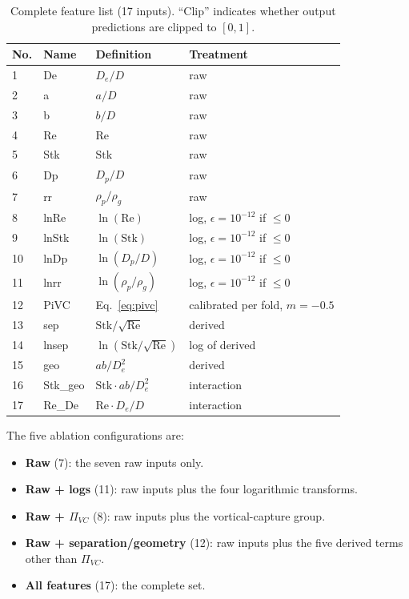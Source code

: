 \documentclass[12pt]{article}
\newcommand{\Stk}{\mathrm{Stk}}
\newcommand{\Rey}{\mathrm{Re}}
\newcommand{\PiVC}{\Pi_{VC}}
\begin{document}
\begin{table}[!ht]\centering
\caption{Complete feature list (17 inputs). ``Clip'' indicates whether output predictions are clipped to $[0,1]$.}
\label{tab:featurelist}\small
\begin{tabular}{llll}
\toprule
No. & Name & Definition & Treatment \\
\midrule
1 & De & $D_e/D$ & raw \\
2 & a & $a/D$ & raw \\
3 & b & $b/D$ & raw \\
4 & Re & $\Rey$ & raw \\
5 & Stk & $\Stk$ & raw \\
6 & Dp & $D_p/D$ & raw \\
7 & rr & $\rho_p/\rho_g$ & raw \\
\midrule
8 & lnRe & $\ln(\Rey)$ & log, $\epsilon=10^{-12}$ if $\leq0$ \\
9 & lnStk & $\ln(\Stk)$ & log, $\epsilon=10^{-12}$ if $\leq0$ \\
10 & lnDp & $\ln(D_p/D)$ & log, $\epsilon=10^{-12}$ if $\leq0$ \\
11 & lnrr & $\ln(\rho_p/\rho_g)$ & log, $\epsilon=10^{-12}$ if $\leq0$ \\
\midrule
12 & PiVC & Eq.~\eqref{eq:pivc} & calibrated per fold, $m=-0.5$ \\
13 & sep & $\Stk/\sqrt{\Rey}$ & derived \\
14 & lnsep & $\ln(\Stk/\sqrt{\Rey})$ & log of derived \\
15 & geo & $ab/D_e^2$ & derived \\
16 & Stk\_geo & $\Stk \cdot ab/D_e^2$ & interaction \\
17 & Re\_De & $\Rey \cdot D_e/D$ & interaction \\
\bottomrule
\end{tabular}
\end{table}

The five ablation configurations are:
\begin{itemize}[noitemsep]
\item \textbf{Raw} (7): the seven raw inputs only.
\item \textbf{Raw + logs} (11): raw inputs plus the four logarithmic transforms.
\item \textbf{Raw + $\PiVC$} (8): raw inputs plus the vortical-capture group.
\item \textbf{Raw + separation/geometry} (12): raw inputs plus the five derived terms other than $\PiVC$.
\item \textbf{All features} (17): the complete set.
\end{itemize}
\end{document}
